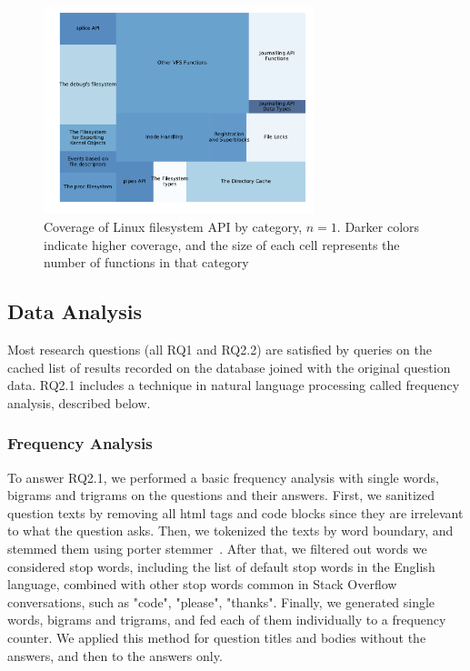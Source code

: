 \begin{figure}[t!]
  \centering
  \includegraphics[width=0.7\textwidth]{scripts/figures/1-1-coveragebycategory.pdf}
  \caption{Coverage of Linux filesystem API by category, $n=1$. Darker colors indicate higher coverage, and the size of each cell represents the number of functions in that category}
  \label{fig:covbycategory}
\end{figure}

\subsection{Data Analysis}\label{subsec:analysis}
Most research questions (all RQ1 and RQ2.2) are satisfied by queries on the cached list of results recorded on the database joined with the original question data. RQ2.1 includes a technique in natural language processing called frequency analysis, described below.

\subsubsection{Frequency Analysis}
To answer RQ2.1, we performed a basic frequency analysis with single words, bigrams and trigrams on the questions and their answers. First, we sanitized question texts by removing all html tags and code blocks since they are irrelevant to what the question asks. Then, we tokenized the texts by word boundary, and stemmed them using porter stemmer~\cite{Porter1980}. After that, we filtered out words we considered stop words, including the list of default stop words in the English language, combined with other stop words common in Stack Overflow conversations, such as "code", "please", "thanks". Finally, we generated single words, bigrams and trigrams, and fed each of them individually to a frequency counter. We applied this method for question titles and bodies without the answers, and then to the answers only.

